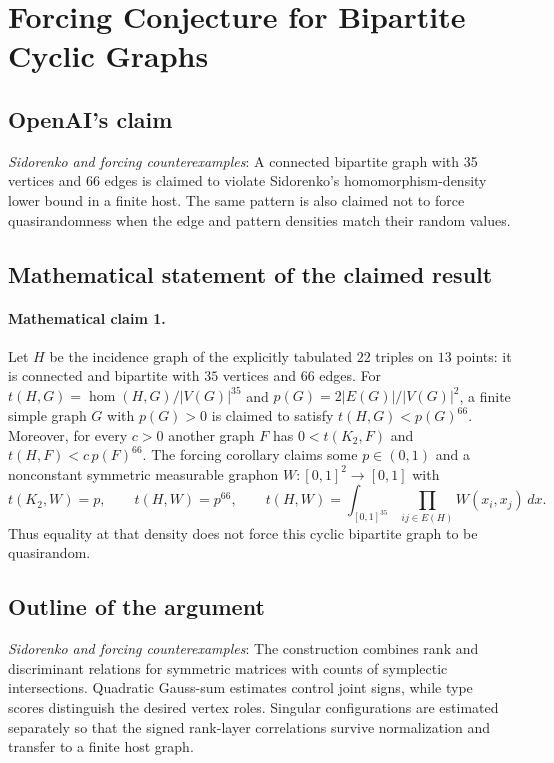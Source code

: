 \documentclass[11pt]{article}
\begin{document}
\section*{Forcing Conjecture for Bipartite Cyclic Graphs}

\subsection{OpenAI's claim}
\textit{Sidorenko and forcing counterexamples}: A connected bipartite graph with 35 vertices and 66 edges is claimed to violate Sidorenko’s homomorphism-density lower bound in a finite host. The same pattern is also claimed not to force quasirandomness when the edge and pattern densities match their random values.

\subsection{Mathematical statement of the claimed result}
\paragraph{Mathematical claim 1.} Let $H$ be the incidence graph of the explicitly tabulated $22$ triples on $13$ points: it is connected and bipartite with $35$ vertices and $66$ edges. For $t(H,G)=\operatorname{hom}(H,G)/|V(G)|^{35}$ and $p(G)=2|E(G)|/|V(G)|^2$, a finite simple graph $G$ with $p(G)>0$ is claimed to satisfy $t(H,G)<p(G)^{66}$. Moreover, for every $c>0$ another graph $F$ has $0<t(K_2,F)$ and $t(H,F)<c\,p(F)^{66}$. The forcing corollary claims some $p\in(0,1)$ and a nonconstant symmetric measurable graphon $W:[0,1]^2\to[0,1]$ with \[t(K_2,W)=p,\qquad t(H,W)=p^{66},\qquad t(H,W)=\int_{[0,1]^{35}}\prod_{ij\in E(H)}W(x_i,x_j)\,dx.\] Thus equality at that density does not force this cyclic bipartite graph to be quasirandom.

\subsection{Outline of the argument}
\textit{Sidorenko and forcing counterexamples}: The construction combines rank and discriminant relations for symmetric matrices with counts of symplectic intersections. Quadratic Gauss-sum estimates control joint signs, while type scores distinguish the desired vertex roles. Singular configurations are estimated separately so that the signed rank-layer correlations survive normalization and transfer to a finite host graph.
\end{document}
